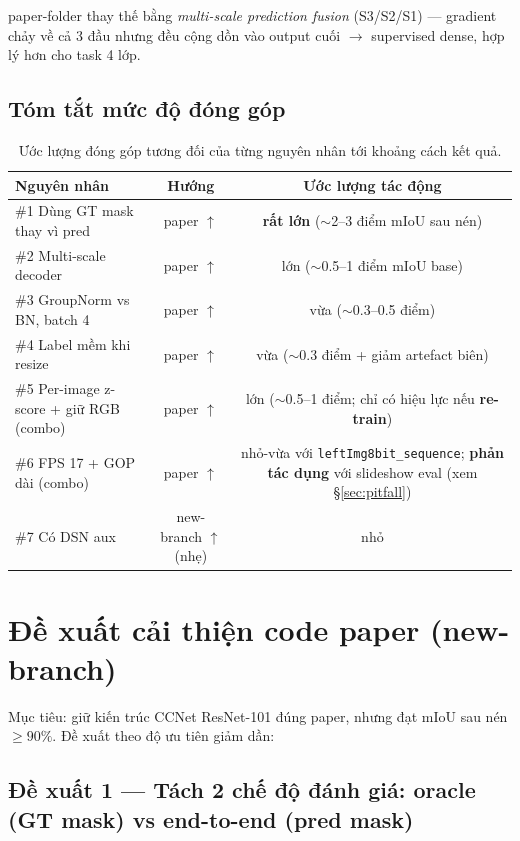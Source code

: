 \documentclass[12pt,a4paper]{article}
\begin{document}
paper-folder thay thế bằng \emph{multi-scale prediction fusion} (S3/S2/S1) — gradient
chảy về cả 3 đầu nhưng đều cộng dồn vào output cuối $\to$ supervised dense, hợp lý
hơn cho task 4 lớp.

\subsection{Tóm tắt mức độ đóng góp}

\begin{table}[H]
\centering
\caption{Ước lượng đóng góp tương đối của từng nguyên nhân tới khoảng cách kết quả.}
\label{tab:contrib}
\begin{tabular}{lcc}
\toprule
Nguyên nhân & Hướng & Ước lượng tác động \\
\midrule
\#1 Dùng GT mask thay vì pred & paper $\uparrow$ & \textbf{rất lớn} ($\sim$2--3 điểm mIoU sau nén) \\
\#2 Multi-scale decoder       & paper $\uparrow$ & lớn ($\sim$0.5--1 điểm mIoU base) \\
\#3 GroupNorm vs BN, batch 4  & paper $\uparrow$ & vừa ($\sim$0.3--0.5 điểm) \\
\#4 Label mềm khi resize      & paper $\uparrow$ & vừa ($\sim$0.3 điểm + giảm artefact biên) \\
\#5 Per-image z-score + giữ RGB (combo) & paper $\uparrow$ & lớn ($\sim$0.5--1 điểm; chỉ có hiệu lực nếu \textbf{re-train}) \\
\#6 FPS 17 + GOP dài (combo)  & paper $\uparrow$ & nhỏ-vừa với \texttt{leftImg8bit\_sequence}; \textbf{phản tác dụng} với slideshow eval (xem \S\ref{sec:pitfall}) \\
\#7 Có DSN aux                & new-branch $\uparrow$ (nhẹ) & nhỏ \\
\bottomrule
\end{tabular}
\end{table}

\section{Đề xuất cải thiện code paper (new-branch)}

Mục tiêu: giữ kiến trúc CCNet ResNet-101 đúng paper, nhưng đạt mIoU sau nén
$\ge 90\%$. Đề xuất theo độ ưu tiên giảm dần:

\subsection{Đề xuất 1 — Tách 2 chế độ đánh giá: oracle (GT mask) vs end-to-end (pred mask)}
\end{document}
